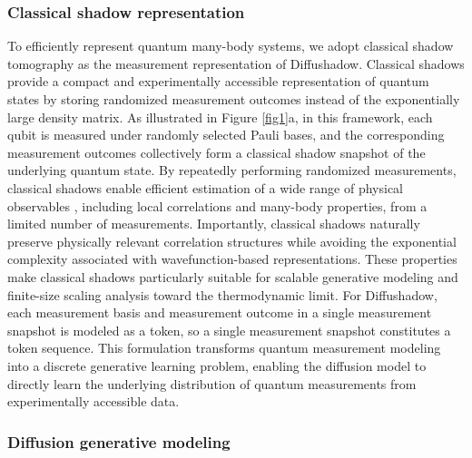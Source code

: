 \documentclass[pdflatex,sn-mathphys-num]{sn-jnl}%
\theoremstyle{thmstyleone}%
\theoremstyle{thmstyletwo}%
\theoremstyle{thmstylethree}%
\begin{document}
\subsubsection{Classical shadow representation}
To efficiently represent quantum many-body systems, we adopt classical shadow tomography \cite{huang2020predicting, aaronson2018shadow} as the measurement representation of Diffushadow. Classical shadows provide a compact and experimentally accessible representation of quantum states by storing randomized measurement outcomes instead of the exponentially large density matrix. As illustrated in Figure \ref{fig1}a, in this framework, each qubit is measured under randomly selected Pauli bases, and the corresponding measurement outcomes collectively form a classical shadow snapshot of the underlying quantum state. By repeatedly performing randomized measurements, classical shadows enable efficient estimation of a wide range of physical observables \cite{huang2021efficient}, including local correlations and many-body properties, from a limited number of measurements. Importantly, classical shadows naturally preserve physically relevant correlation structures while avoiding the exponential complexity associated with wavefunction-based representations. These properties make classical shadows particularly suitable for scalable generative modeling and finite-size scaling analysis toward the thermodynamic limit. 
For Diffushadow, each measurement basis and measurement outcome in a single measurement snapshot is modeled as a token, so a single measurement snapshot constitutes a token sequence. This formulation transforms quantum measurement modeling into a discrete generative learning problem, enabling the diffusion model to directly learn the underlying distribution of quantum measurements from experimentally accessible data. 





\subsubsection{Diffusion generative modeling}
\end{document}
